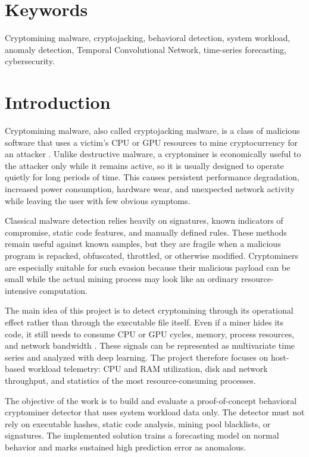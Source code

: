 \documentclass[a4paper,12pt]{extarticle}
\begin{document}
\section*{Keywords}
Cryptomining malware, cryptojacking, behavioral detection, system workload, anomaly detection, Temporal Convolutional Network, time-series forecasting, cybersecurity.

\newpage
\section{Introduction}
\label{sec:introduction}

Cryptomining malware, also called cryptojacking malware, is a class of malicious software that uses a victim's CPU or GPU resources to mine cryptocurrency for an attacker \cite{darabian2020cryptomining,almurshid2024holistic}. Unlike destructive malware, a cryptominer is economically useful to the attacker only while it remains active, so it is usually designed to operate quietly for long periods of time. This causes persistent performance degradation, increased power consumption, hardware wear, and unexpected network activity while leaving the user with few obvious symptoms.

Classical malware detection relies heavily on signatures, known indicators of compromise, static code features, and manually defined rules. These methods remain useful against known samples, but they are fragile when a malicious program is repacked, obfuscated, throttled, or otherwise modified. Cryptominers are especially suitable for such evasion because their malicious payload can be small while the actual mining process may look like an ordinary resource-intensive computation.

The main idea of this project is to detect cryptomining through its operational effect rather than through the executable file itself. Even if a miner hides its code, it still needs to consume CPU or GPU cycles, memory, process resources, and network bandwidth \cite{darabian2020cryptomining,almurshid2024holistic}. These signals can be represented as multivariate time series and analyzed with deep learning. The project therefore focuses on host-based workload telemetry: CPU and RAM utilization, disk and network throughput, and statistics of the most resource-consuming processes.

The objective of the work is to build and evaluate a proof-of-concept behavioral cryptominer detector that uses system workload data only. The detector must not rely on executable hashes, static code analysis, mining pool blacklists, or signatures. The implemented solution trains a forecasting model on normal behavior and marks sustained high prediction error as anomalous.
\end{document}
